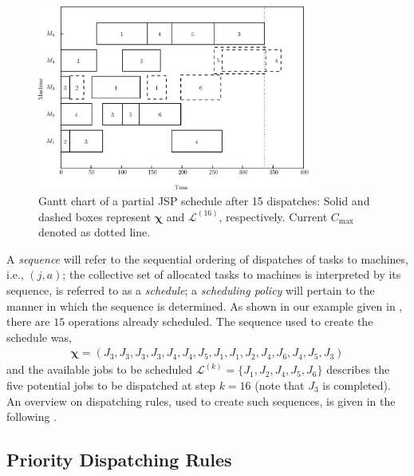 \documentclass[smallextended]{svjour3}
\renewcommand{\vchi}{\bm \chi}
\begin{document}
\begin{figure}[t!]\centering
	\includegraphics[width=0.8\textwidth]{figures/jssp_example_nocolor.eps}
	\caption[Gantt chart of a partial JSP schedule]{Gantt chart of a
		partial JSP schedule after 15 dispatches: Solid and dashed boxes
		represent $\vchi$ and $\mathcal{L}^{(16)}$, respectively. Current
		$C_{\max}$ denoted as dotted line.}
	\label{fig:jssp:example}
\end{figure}

A \emph{sequence} will refer to the sequential ordering of dispatches of tasks 
to machines, i.e., $(j,a)$; 
the collective set of allocated tasks to machines is interpreted by its 
sequence, is referred to as a \emph{schedule}; 
a \emph{scheduling policy} will pertain to the manner in which 
the sequence is determined.  As shown in our example given in 
, there are $15$ operations already scheduled. The 
sequence used to create the schedule was,
\begin{eqnarray}
	\vchi=\left(J_3,J_3,J_3,J_3,J_4,J_4,J_5,J_1,J_1,J_2,J_4,J_6,J_4,J_5,J_3\right)
\end{eqnarray}
and the available jobs to be scheduled
$\mathcal{L}^{(k)}=\{J_1,J_2,J_4,J_5,J_6\}$ describes the five potential jobs 
to be dispatched at step $k=16$ (note that $J_3$ is completed). An overview on 
dispatching rules, used to create such sequences, is given in the following 
.

\subsection{Priority Dispatching Rules}\label{ch:dispatchrules}
\end{document}
